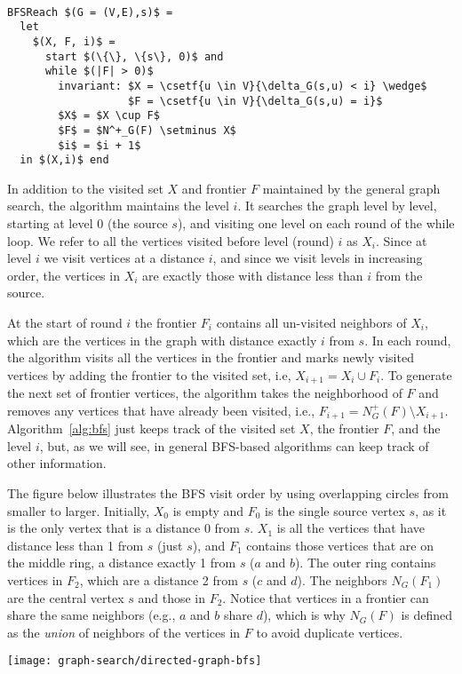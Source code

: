 \begin{algorithm}~
\label{alg:bfs}
\begin{lstlisting}
BFSReach $(G = (V,E),s)$ =
  let
    $(X, F, i)$ = 
      start $(\{\}, \{s\}, 0)$ and
      while $(|F| > 0)$ 
        invariant: $X = \csetf{u \in V}{\delta_G(s,u) < i} \wedge$
                   $F = \csetf{u \in V}{\delta_G(s,u) = i}$
        $X$ = $X \cup F$        
        $F$ = $N^+_G(F) \setminus X$  
        $i$ = $i + 1$          
  in $(X,i)$ end
\end{lstlisting}
\end{algorithm}

In addition to the visited set $X$ and frontier $F$ maintained
by the general graph search, the algorithm maintains the level $i$.
%
It searches the graph level by level, starting at level $0$ (the
source $s$), and visiting one level on each round of the while loop.
%
We refer to all the vertices visited before level (round) $i$ as $X_i$.
%
Since at level $i$ we visit vertices at a distance $i$, and since we
visit levels in increasing order, the vertices in $X_i$ are exactly
those with distance less than $i$ from the source.
%

At the start of round $i$ the frontier $F_i$ contains all
un-visited neighbors of $X_i$, which are the vertices in the graph with
distance exactly $i$ from $s$.
% 
In each round, the algorithm visits all the vertices in the frontier
and marks newly visited vertices by adding the frontier to the visited
set, i.e, $X_{i+1} = X_i \cup F_i$.  
%
To generate the next set of frontier vertices, the algorithm takes the
neighborhood of $F$ and removes any vertices that have already been
visited, i.e., $F_{i+1} = N^+_G(F) \setminus X_{i+1}$. 
%
Algorithm~\ref{alg:bfs} just keeps track of the visited set $X$, the frontier
$F$,
and the level $i$, but, as we will see, in general BFS-based algorithms can keep
track of other information.


\begin{example}
\label{ex:bfs::levels}
The figure below illustrates the BFS visit order by using overlapping
circles from smaller to larger.  Initially, $X_0$ is empty and $F_0$
is the single source vertex $s$, as it is the only vertex that is a
distance 0 from $s$.  $X_1$ is all the vertices that have distance
less than 1 from $s$ (just $s$), and $F_1$ contains those vertices
that are on the middle ring, a distance exactly 1 from $s$ ($a$ and
$b$).  The outer ring contains vertices in $F_2$, which are a distance
2 from $s$ ($c$ and $d$).  The neighbors $N_G(F_1)$ are the central
vertex $s$ and those in $F_2$.  Notice that vertices in a frontier can
share the same neighbors (e.g., $a$ and $b$ share $d$), which is why
$N_G(F)$ is defined as the \emph{union} of neighbors of the vertices
in $F$ to avoid duplicate vertices.
  
\begin{center}
\texttt{[image: graph-search/directed-graph-bfs]}
\end{center}
\end{example}


